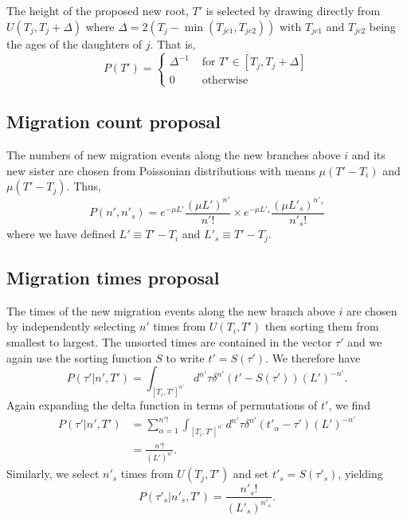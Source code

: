 \documentclass[a4paper,11pt]{article}
\begin{document}
The height of the proposed new root, $T'$ is selected by drawing
directly from $U(T_j,T_j+\Delta)$ where
$\Delta=2(T_j-\min(T_{jc1},T_{jc2}))$ with $T_{jc1}$ and $T_{jc2}$
being the ages of the daughters of $j$. That is,
\begin{equation}
  P(T')=\left\{\begin{array}{rl}
\Delta^{-1} & \text{ for }T'\in[T_j,T_j+\Delta]\\
0 & \text{ otherwise}\end{array}\right.
\end{equation}

\subsection{Migration count proposal}

The numbers of new migration events along the new branches above $i$
and its new sister are chosen from Poissonian distributions with means
$\mu(T'-T_i)$ and $\mu(T'-T_j)$. Thus,
\begin{equation}
  P(n',n'_s)=e^{-\mu L'}\frac{(\mu L')^{n'}}{n'!}
  \times e^{-\mu L'_s}\frac{(\mu L'_s)^{n'_s}}{n'_s!}
\end{equation}
where we have defined $L'\equiv T'-T_i$ and $L'_s\equiv T'-T_j$.

\subsection{Migration times proposal}

The times of the new migration events along the new branch above $i$
are chosen by independently selecting $n'$ times from $U(T_i,T')$ then
sorting them from smallest to largest. The unsorted times are
contained in the vector $\tau'$ and we again use the sorting function
$S$ to write $t'=S(\tau')$. We therefore have
\begin{equation}
  P(\tau'|n',T')=\int_{[T_i,T']^{n'}}d^{n'}\tau\delta^{n'}(t'-S(\tau'))(L')^{-n'}.
\end{equation}
Again expanding the delta function in terms of permutations of $t'$,
we find
\begin{align}
P(\tau'|n',T')&=\sum_{\alpha=1}^{n'!}\int_{[T_i,T']^{n'}}d^{n'}\tau\delta^{n'}(t'_\alpha-\tau')(L')^{-n'}\nonumber\\
&=\frac{n'!}{(L')^{n'}}.
\end{align}
Similarly, we select $n'_s$ times from $U(T_j,T')$ and set
$t'_s=S(\tau'_s)$, yielding
\begin{equation}
  P(\tau'_s|n'_s,T')=\frac{n'_s!}{(L'_s)^{n'_s}}.
\end{equation}
\end{document}
